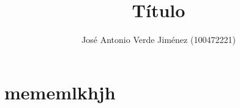\documentclass{apuntes}
\title{Título}
\author{José Antonio Verde Jiménez (100472221)}
\begin{document}
    \titulo

    \lipsum[2-4]

    \section*{mememlkhjh}
\end{document}
